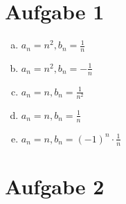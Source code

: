 \documentclass{article}
\begin{document}
	\section*{Aufgabe 1}
	\begin{enumerate}[a)]
		\item $a_n = n^2, b_n = \frac{1}{n}$
		\item $a_n = n^2, b_n = -\frac{1}{n}$
		\item $a_n = n, b_n = \frac{1}{n^2}$
		\item $a_n = n, b_n = \frac{1}{n}$
		\item $a_n = n, b_n = (-1)^n \cdot \frac{1}{n}$
	\end{enumerate}
	\section*{Aufgabe 2}
\end{document}
